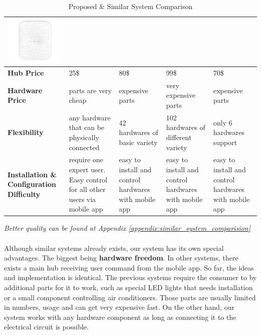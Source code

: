 \documentclass[12pt, oneside, a4paper]{book}
\newcommand\boldcolor[1]{\textcolor{bold}{\textbf{#1}}}
\begin{document}
\begin{table}[H]
\begin{center}
\begin{tabularx}{1\linewidth}{|m{2.2cm}*4{|X}|}
						\includegraphics[width=\linewidth]{img/samsung_hw.png}
					 \\\hline

					\boldcolor{Hub Price} & 25\$ & 80\$ & 99\$ & 70\$ \\\hline
					\boldcolor{Hardware Price} & parts are very cheap &  expensive parts & very expensive parts & expensive parts \\\hline
					\boldcolor{Flexibility} & any hardware that can be physically connected & 42 hardwares of basic variety\cite{insteon_p} & 102 hardwares of different variety\cite{wink_p} & only 6 hardwares support \cite{samsung_p} \\\hline
					
					\boldcolor{Installation \& Configuration Difficulty} & require one expert user. Easy control for all other users via mobile app & easy to install and control hardwares with mobile app  &easy to install and control hardwares with mobile app  & easy to install and control hardwares with mobile app
					\\\hline
				\end{tabularx}
			\end{center}
			\caption{Proposed \& Similar System Comparison}
		\end{table}
		\textit{Better quality can be found at Appendix \ref{appendix:similar_system_comparision}}
		\newpage
		\paragraph{} Although similar systems already exists, our system has its own special advantages. The biggest being \textbf{hardware freedom}. In other systems, there exists a main hub receiving user command from the mobile app. So far, the ideas and implementation is identical. The previous systems require the consumer to by additional parts for it to work, such as special LED lights that needs installation or a small component controlling air conditioners. Those parts are usually limited in numbers, usage and can get very expensive fast. On the other hand, our system works with any hardware component as long as connecting it to the electrical circuit is possible.
\end{document}
